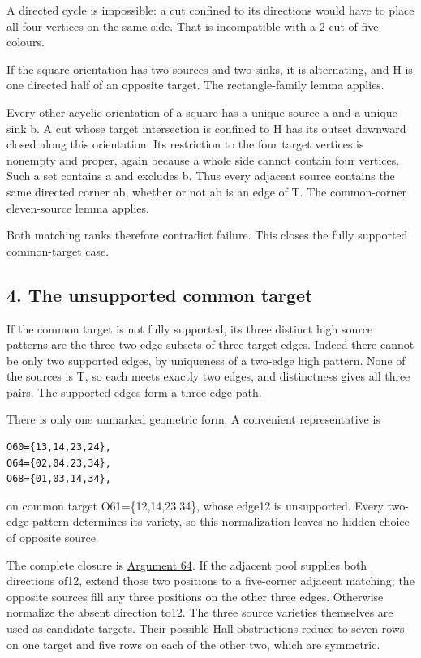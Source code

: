 \documentclass[
  10pt,
]{article}
\begin{document}
A directed cycle is impossible: a cut confined to its directions would
have to place all four vertices on the same side. That is incompatible
with a 2 cut of five colours.

If the square orientation has two sources and two sinks, it is
alternating, and H is one directed half of an opposite target. The
rectangle-family lemma applies.

Every other acyclic orientation of a square has a unique source a and a
unique sink b. A cut whose target intersection is confined to H has its
outset downward closed along this orientation. Its restriction to the
four target vertices is nonempty and proper, again because a whole side
cannot contain four vertices. Such a set contains a and excludes b. Thus
every adjacent source contains the same directed corner ab, whether or
not ab is an edge of T. The common-corner eleven-source lemma applies.

Both matching ranks therefore contradict failure. This closes the fully
supported common-target case.

\hypertarget{the-unsupported-common-target}{%
\subsection*{4. The unsupported common
target}\label{the-unsupported-common-target}}

If the common target is not fully supported, its three distinct high
source patterns are the three two-edge subsets of three target edges.
Indeed there cannot be only two supported edges, by uniqueness of a
two-edge high pattern. None of the sources is T, so each meets exactly
two edges, and distinctness gives all three pairs. The supported edges
form a three-edge path.

There is only one unmarked geometric form. A convenient representative
is

\begin{verbatim}
O60={13,14,23,24},
O64={02,04,23,34},
O68={01,03,14,34},
\end{verbatim}

on common target O61=\{12,14,23,34\}, whose edge12 is unsupported. Every
two-edge pattern determines its variety, so this normalization leaves no
hidden choice of opposite source.

The complete closure is \protect\hyperlink{arg-64}{Argument 64}. If the
adjacent pool supplies both directions of12, extend those two positions
to a five-corner adjacent matching; the opposite sources fill any three
positions on the other three edges. Otherwise normalize the absent
direction to12. The three source varieties themselves are used as
candidate targets. Their possible Hall obstructions reduce to seven rows
on one target and five rows on each of the other two, which are
symmetric.
\end{document}
